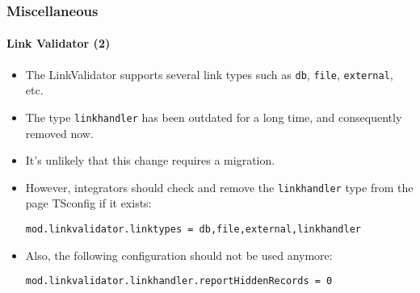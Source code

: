 %

\begin{frame}[fragile]
	\frametitle{Miscellaneous}
	\framesubtitle{Link Validator (2)}


	\begin{itemize}
		\item The LinkValidator supports several link types such as
			\small\texttt{db}\normalsize, \small\texttt{file}\normalsize,
			\small\texttt{external}\normalsize, etc.
		\item The type \small\texttt{linkhandler}\normalsize
			has been outdated for a long time, and consequently removed now.
		\item It's unlikely that this change requires a migration.
		\item However, integrators should check and remove the \texttt{linkhandler}
			type from the page TSconfig if it exists:
\begin{lstlisting}
mod.linkvalidator.linktypes = db,file,external,linkhandler
\end{lstlisting}

		\item Also, the following configuration should not be used anymore:
\begin{lstlisting}
mod.linkvalidator.linkhandler.reportHiddenRecords = 0
\end{lstlisting}

	\end{itemize}

\end{frame}

